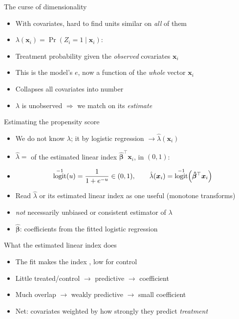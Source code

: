 \documentclass[table, xcolor = {dvipsnames}, 9pt]{beamer}
\theoremstyle{plain}
\newcommand{\mh}[1]{{\color{magenta}{#1}}}
\DeclareMathOperator{\logit}{\rm{logit}}
\begin{document}
\begin{frame}[t]{The curse of dimensionality}
\vfill
\begin{itemize} \vfill
\item With \mh{many} covariates, hard to find units similar on \emph{all} of them \vfill
\item \mh{Propensity score} $\lambda(\bm{x}_i) = \Pr(Z_i = 1 \mid \bm{x}_i)$: \vfill 
\item[] Treatment probability given the \emph{observed} covariates $\bm{x}_i$ \vfill
\item This is the model's $e$, now a function of the \emph{whole} vector $\bm{x}_i$ \vfill
\item Collapses all covariates into \mh{one} number \vfill
\item[] $\lambda$ is unobserved $\Rightarrow$ we match on its \emph{estimate} \vfill
\end{itemize} \vfill
\end{frame}
\begin{frame}[t]{Estimating the propensity score}
\vfill
\begin{itemize} \vfill
\item We do not know $\lambda$; \mh{estimate} it by logistic regression $\to \hat{\lambda}(\bm{x}_i)$ \vfill
\item $\hat{\lambda} = $ \mh{inverse-logit} of the estimated linear index $\bm{\hat{\beta}}^{\top}\bm{x}_i$, in $(0,1)$: \vfill
\item[]
\begin{equation*}
\logit^{-1}(u) = \frac{1}{1 + e^{-u}} \in (0,1), \qquad \hat{\lambda}(\bm{x}_i) = \logit^{-1}\!\left(\bm{\hat{\beta}}^{\top}\bm{x}_i\right)
\end{equation*} \vfill
\item Read $\hat{\lambda}$ or its estimated linear index as one useful \mh{1-D score} (monotone transforms) \vfill
\item[] \emph{not} necessarily unbiased or consistent estimator of $\lambda$ \vfill
\item $\bm{\hat{\beta}}$: \mh{estimated} coefficients from the fitted logistic regression \vfill
\end{itemize} \vfill
\end{frame}
\begin{frame}[t]{What the estimated linear index does}
\vfill
\begin{itemize} \vfill
\item The fit makes the index \mh{high for treated}, low for control \vfill
\item Little treated/control \mh{overlap} $\to$ predictive $\to$ \mh{large} coefficient \vfill
\item Much overlap $\to$ weakly predictive $\to$ small coefficient \vfill
\item Net: covariates weighted by how strongly they predict \emph{treatment} \vfill
\end{itemize} \vfill
\end{frame}
\end{document}
